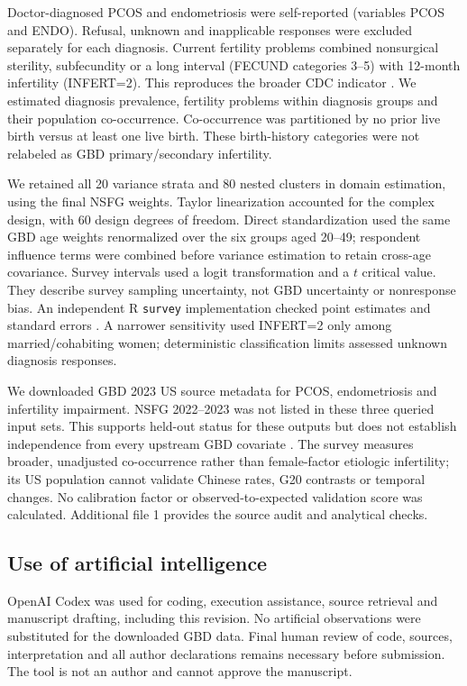 \documentclass[11pt,a4paper]{article}
\begin{document}
Doctor-diagnosed PCOS and endometriosis were self-reported (variables PCOS and ENDO). Refusal, unknown and inapplicable responses were excluded separately for each diagnosis. Current fertility problems combined nonsurgical sterility, subfecundity or a long interval (FECUND categories 3--5) with 12-month infertility (INFERT=2). This reproduces the broader CDC indicator \cite{cdcreport}. We estimated diagnosis prevalence, fertility problems within diagnosis groups and their population co-occurrence. Co-occurrence was partitioned by no prior live birth versus at least one live birth. These birth-history categories were not relabeled as GBD primary/secondary infertility.

We retained all 20 variance strata and 80 nested clusters in domain estimation, using the final NSFG weights. Taylor linearization accounted for the complex design, with 60 design degrees of freedom. Direct standardization used the same GBD age weights renormalized over the six groups aged 20--49; respondent influence terms were combined before variance estimation to retain cross-age covariance. Survey intervals used a logit transformation and a $t$ critical value. They describe survey sampling uncertainty, not GBD uncertainty or nonresponse bias. An independent R \texttt{survey} implementation checked point estimates and standard errors \cite{survey}. A narrower sensitivity used INFERT=2 only among married/cohabiting women; deterministic classification limits assessed unknown diagnosis responses.

We downloaded GBD 2023 US source metadata for PCOS, endometriosis and infertility impairment. NSFG 2022--2023 was not listed in these three queried input sets. This supports held-out status for these outputs but does not establish independence from every upstream GBD covariate \cite{sources}. The survey measures broader, unadjusted co-occurrence rather than female-factor etiologic infertility; its US population cannot validate Chinese rates, G20 contrasts or temporal changes. No calibration factor or observed-to-expected validation score was calculated. Additional file 1 provides the source audit and analytical checks.

\subsection{Use of artificial intelligence}
OpenAI Codex was used for coding, execution assistance, source retrieval and manuscript drafting, including this revision. No artificial observations were substituted for the downloaded GBD data. Final human review of code, sources, interpretation and all author declarations remains necessary before submission. The tool is not an author and cannot approve the manuscript.
\end{document}
